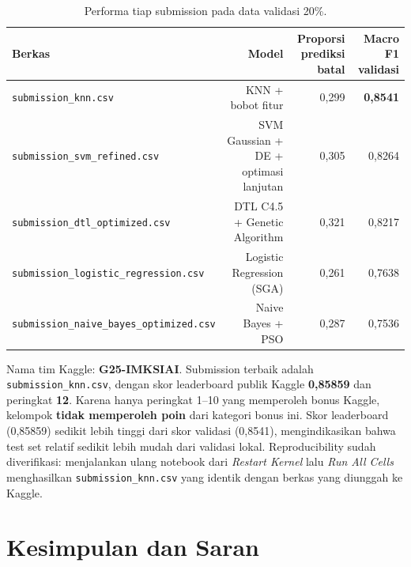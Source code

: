 \documentclass[12pt,a4paper]{article}
\begin{document}
\begin{table}[H]\centering\small
\begin{tabular}{lrrr}
\toprule
Berkas & Model & Proporsi prediksi batal & Macro F1 validasi\\
\midrule
\texttt{submission\_knn.csv} & KNN + bobot fitur & 0,299 & \textbf{0,8541}\\
\texttt{submission\_svm\_refined.csv} & SVM Gaussian + DE + optimasi lanjutan & 0,305 & 0,8264\\
\texttt{submission\_dtl\_optimized.csv} & DTL C4.5 + Genetic Algorithm & 0,321 & 0,8217\\
\texttt{submission\_logistic\_regression.csv} & Logistic Regression (SGA) & 0,261 & 0,7638\\
\texttt{submission\_naive\_bayes\_optimized.csv} & Naive Bayes + PSO & 0,287 & 0,7536\\
\bottomrule
\end{tabular}
\caption{Performa tiap submission pada data validasi 20\%.}
\label{tab:submission}
\end{table}

Nama tim Kaggle: \textbf{G25-IMKSIAI}. Submission terbaik adalah \texttt{submission\_knn.csv}, dengan skor leaderboard publik Kaggle \textbf{0,85859} dan peringkat \textbf{12}. Karena hanya peringkat 1--10 yang memperoleh bonus Kaggle, kelompok \textbf{tidak memperoleh poin} dari kategori bonus ini. Skor leaderboard (0,85859) sedikit lebih tinggi dari skor validasi (0,8541), mengindikasikan bahwa test set relatif sedikit lebih mudah dari validasi lokal. Reproducibility sudah diverifikasi: menjalankan ulang notebook dari \textit{Restart Kernel} lalu \textit{Run All Cells} menghasilkan \texttt{submission\_knn.csv} yang identik dengan berkas yang diunggah ke Kaggle.

\section{Kesimpulan dan Saran}
\end{document}
